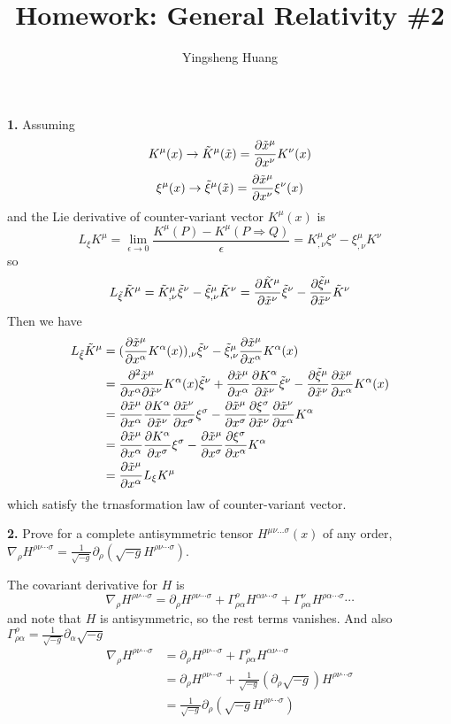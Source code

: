 \documentclass{article}
\title{Homework: General Relativity \#2}
\author{Yingsheng Huang}
\renewcommand{\a}{\alpha}
\newcommand{\s}{\sigma}
\renewcommand{\G}{\Gamma}
\newcommand{\tx}{\tilde x}
\begin{document}
\maketitle
{\bf1.}\quad
Assuming
$$K^{\mu}(x)\rightarrow \tilde{K}^{\mu}(\tilde x)=\pdv{\tilde x^{\mu}}{x^{\nu}}K^{\nu}(x)$$
$$\xi^{\mu}(x)\rightarrow \tilde{\xi}^{\mu}(\tilde x)=\pdv{\tilde x^{\mu}}{x^{\nu}}\xi^{\nu}(x)$$
and the Lie derivative of counter-variant vector $K^{\mu}(x)$ is
$$L_{\xi}K^{\mu}=\lim_{\epsilon\rightarrow0}\frac{K^{\mu}(P)-K^{\mu}(P\Rightarrow Q)}{\epsilon}=K^{\mu}_{,\nu}\xi^{\nu}-\xi^{\mu}_{,\nu}K^{\nu}$$
so
$$L_{\tilde\xi}\tilde{K}^{\mu}=\tilde K^{\mu}_{,\nu}\tilde\xi^{\nu}-\tilde\xi^{\mu}_{,\nu}\tilde K^{\nu}=\pdv{\tilde K^{\mu}}{\tilde x^{\nu}}\tilde\xi^{\nu}-\pdv{\tilde\xi^{\mu}}{\tilde x^{\nu}}\tilde K^{\nu}$$
Then we have
\begin{align*}
  L_{\tilde\xi}\tilde{K}^{\mu}&=(\pdv{\tilde x^{\mu}}{x^{\alpha}}K^{\alpha}(x))_{,\nu}\tilde\xi^{\nu}-\tilde\xi^{\mu}_{,\nu}\pdv{\tilde x^{\mu}}{x^{\alpha}}K^{\alpha}(x)\\
  &=\pdv{\tilde x^{\mu}}{x^{\alpha}}{\tilde x^{\nu}}K^{\alpha}(x)\tilde\xi^{\nu}+\pdv{\tilde x^{\mu}}{x^{\alpha}}\pdv{ K^{\a}}{\tilde x^{\nu}}\tilde\xi^{\nu}-\pdv{\tilde\xi^{\mu}}{\tilde x^{\nu}}\pdv{\tilde x^{\mu}}{x^{\alpha}}K^{\alpha}(x)\\
  &=\pdv{\tilde x^{\mu}}{x^{\a}}\pdv{K^{\a}}{\tx^{\nu}}\pdv{\tx^{\nu}}{x^{\s}}\xi^{\s}-\pdv{\tx^{\mu}}{x^{\s}}\pdv{\xi^{\s}}{\tx^{\nu}}\pdv{\tx^{\nu}}{x^{\a}}K^{\a}\\
  &=\pdv{\tx^{\mu}}{x^{\a}}\pdv{K^{\a}}{x^{\s}}\xi^{\s}-\pdv{\tx^{\mu}}{x^{\s}}\pdv{\xi^{\s}}{x^{\a}}K^{\a}\\
  &=\pdv{\tx^{\mu}}{x^{\a}}L_{\xi}K^{\mu}
\end{align*}
which satisfy the trnasformation law of counter-variant vector.

{\bf2.}\quad
Prove for a complete antisymmetric tensor $H^{\mu\nu\dots\s}(x)$ of any order, $\nabla_{\rho}H^{\rho\nu\cdots\s}=\frac{1}{\sqrt{-g}}\partial_{\rho}(\sqrt{-g}H^{\rho\nu\cdots\s})$.

The covariant derivative for $H$ is
$$\nabla_{\rho}H^{\rho\nu\cdots\s}=\partial_{\rho}H^{\rho\nu\cdots\s}+\G^{\rho}_{\rho\a}H^{\a\nu\cdots\s}+\G^{\nu}_{\rho\a}H^{\rho\a\cdots\s}\cdots$$
and note that $H$ is antisymmetric, so the rest terms vanishes. And also $\G^{\rho}_{\rho\a}=\frac{1}{\sqrt{-g}}\partial_{\a}\sqrt{-g}$
\begin{align*}
  \nabla_{\rho}H^{\rho\nu\cdots\s}&=\partial_{\rho}H^{\rho\nu\cdots\s}+\G^{\rho}_{\rho\a}H^{\a\nu\cdots\s}\\
  &=\partial_{\rho}H^{\rho\nu\cdots\s}+\frac{1}{\sqrt{-g}}(\partial_{\rho}\sqrt{-g})H^{\rho\nu\cdots\s}\\
  &=\frac{1}{\sqrt{-g}}\partial_{\rho}(\sqrt{-g}H^{\rho\nu\cdots\s})
\end{align*}
\end{document}

